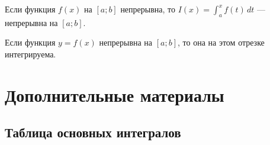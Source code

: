 \begin{theorem}[Непрерывность $I(x)$]
    Если функция $f(x)$ на $[a;b]$ непрерывна, то $I(x) = \int_{a}^{x} f(t)\, dt$ --- непрерывна на $[a;b]$.
\end{theorem}

\begin{theorem}
    Если функция $y=f(x)$ непрерывна на $[a;b]$, то она на этом отрезке интегрируема.
\end{theorem}

\newpage
\section{Дополнительные материалы}

\subsection{Таблица основных интегралов}

